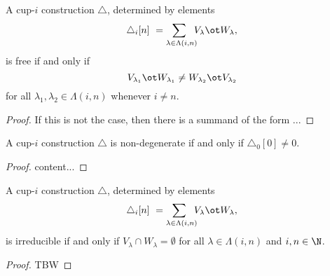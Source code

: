 \begin{lemma} \label{l:freeness recasted}
	A cup-$i$ construction $\triangle$, determined by elements
	\[
	\triangle_i [n] \ =
	\sum_{\lambda \in \Lambda(i,n) \kern-5pt} V_\lambda \ot W_\lambda,
	\]
	is free if and only if
	\[
	V_{\lambda_1} \ot W_{\lambda_1} \neq
	W_{\lambda_2} \ot V_{\lambda_2}
	\]
	for all $\lambda_1, \lambda_2 \in \Lambda(i,n)$ whenever $i \neq n$.
\end{lemma}

\begin{proof}
	If this is not the case, then there is a summand of the form ...
\end{proof}

\begin{lemma} \label{l:non-degeneracy recasted}
	A cup-$i$ construction $\triangle$ is non-degenerate if and only if $\triangle_0 [0] \neq 0$.
\end{lemma}

\begin{proof}
	content...
\end{proof}

\begin{lemma} \label{l:irreducibility recasted}
	A cup-$i$ construction $\triangle$, determined by elements
	\[
	\triangle_i [n] \ =
	\sum_{\lambda \in \Lambda(i,n) \kern-5pt} V_\lambda \ot W_\lambda,
	\]
	is irreducible if and only if $V_\lambda \cap W_\lambda = \emptyset$ for all $\lambda \in \Lambda(i,n)$ and $i, n \in \N$.
\end{lemma}

\begin{proof}
	TBW
\end{proof}



%


